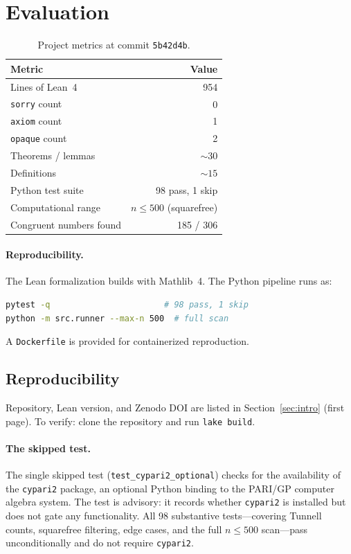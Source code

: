 \documentclass[11pt,a4paper]{article}
\theoremstyle{definition}
\newcommand{\lean}[1]{\texttt{#1}}
\begin{document}
\section{Evaluation}\label{sec:eval}

\begin{table}[ht]
\centering
\begin{tabular}{@{}lr@{}}
\toprule
\textbf{Metric} & \textbf{Value} \\
\midrule
Lines of Lean~4            & 954 \\
\lean{sorry} count         & 0 \\
\lean{axiom} count         & 1 \\
\lean{opaque} count        & 2 \\
Theorems / lemmas          & ${\sim}30$ \\
Definitions                & ${\sim}15$ \\
Python test suite          & 98 pass, 1 skip \\
Computational range        & $n \le 500$ (squarefree) \\
Congruent numbers found    & 185 / 306 \\
\bottomrule
\end{tabular}
\caption{Project metrics at commit \texttt{5b42d4b}.}
\label{tab:metrics}
\end{table}

\paragraph{Reproducibility.}
The Lean formalization builds with Mathlib~4.  The Python pipeline
runs as:
\begin{lstlisting}[language=bash,keywordstyle={},commentstyle={}]
pytest -q                       # 98 pass, 1 skip
python -m src.runner --max-n 500  # full scan
\end{lstlisting}
A \texttt{Dockerfile} is provided for containerized reproduction.

\subsection*{Reproducibility}

Repository, Lean version, and Zenodo DOI are listed in
Section~\ref{sec:intro} (first page).  To verify: clone the
repository and run \texttt{lake build}.

\paragraph{The skipped test.}
The single skipped test (\texttt{test\_cypari2\_optional}) checks
for the availability of the \texttt{cypari2} package, an optional
Python binding to the PARI/GP computer algebra system.
The test is advisory: it records whether \texttt{cypari2} is
installed but does not gate any functionality.  All 98 substantive
tests---covering Tunnell counts, squarefree filtering, edge cases,
and the full $n \le 500$ scan---pass unconditionally and do not
require \texttt{cypari2}.
\end{document}
